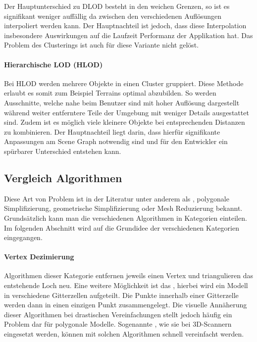 Der Hauptunterschied zu DLOD besteht in den weichen Grenzen, so ist es signifikant weniger auffällig da zwischen den verschiedenen Auflösungen interpoliert werden kann.
Der Hauptnachteil ist jedoch, dass diese Interpolation insbesondere Auswirkungen auf die Laufzeit Performanz der Applikation hat.
Das Problem des Clusterings ist auch für diese Variante nicht gelöst.

\paragraph{Hierarchische LOD (HLOD)}
Bei HLOD werden mehrere Objekte in einen Cluster gruppiert.
Diese Methode erlaubt es somit zum Beispiel Terrains optimal abzubilden. So werden Ausschnitte, welche nahe beim Benutzer sind mit hoher Auflösung dargestellt während weiter entferntere Teile der Umgebung mit weniger Details ausgestattet sind.
Zudem ist es möglich viele kleinere Objekte bei entsprechenden Distanzen zu kombinieren.
Der Hauptnachteil liegt darin, dass hierfür signifikante Anpassungen am Scene Graph notwendig sind und für den Entwickler ein spürbarer Unterschied entstehen kann.

\subsection{Vergleich Algorithmen}
\label{chap:lodAlgorithmComparison}

Diese Art von Problem ist in der Literatur unter anderem als , polygonale Simplifizierung, geometrische Simplifizierung oder Mesh Reduzierung bekannt.
Grundsätzlich kann man die verschiedenen Algorithmen in Kategorien einteilen.
Im folgenden Abschnitt wird auf die Grundidee der verschiedenen Kategorien eingegangen.

\paragraph{Vertex Dezimierung}
Algorithmen dieser Kategorie entfernen jeweils einen Vertex und triangulieren das entstehende Loch neu.
Eine weitere Möglichkeit ist das , hierbei wird ein Modell in verschiedene Gitterzellen aufgeteilt. Die Punkte innerhalb einer Gitterzelle werden dann in einen einzigen Punkt zusammengelegt. Die visuelle Annäherung dieser Algorithmen bei drastischen Vereinfachungen stellt jedoch häufig ein Problem dar für polygonale Modelle. Sogenannte , wie sie bei 3D-Scannern eingesetzt werden, können mit solchen Algorithmen schnell vereinfacht werden.

